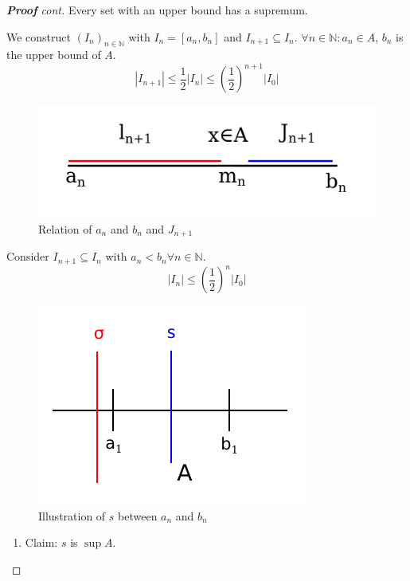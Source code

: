\documentclass[a4paper,landscape,twocolumn]{article}
\newcommand\abs[1]{\left|#1\right|}
\begin{document}
\begin{proof}[\textbf{Proof} cont]
  Every set with an upper bound has a supremum.

  We construct $(I_n)_{n \in \mathbb N}$ with $I_n = [a_n, b_n]$ and $I_{n+1} \subseteq I_n$.
  $\forall n \in \mathbb N: a_n \in A$, $b_n$ is the upper bound of $A$.
  \[ \abs{I_{n+1}} \leq \frac12 \abs{I_n} \leq \left(\frac12\right)^{n+1} \abs{I_0} \]

  \begin{figure}[!h]
    \begin{center}
      \includegraphics{img/proof_interval.pdf}
      \caption[width=200pt]{Relation of $a_n$ and $b_n$ and $J_{n+1}$}
    \end{center}
  \end{figure}

  Consider $I_{n+1} \subseteq I_n$ with $a_n < b_n \forall n \in \mathbb N$.
  \[ \abs{I_n} \leq \left(\frac12\right)^n \abs{I_0} \]

  \begin{figure}[!h]
    \begin{center}
      \includegraphics{img/proof_interval2.pdf}
      \caption[width=200pt]{Illustration of $s$ between $a_n$ and $b_n$}
    \end{center}
  \end{figure}

  \begin{enumerate}
    \item
      Claim: $s$ is $\sup{A}$.


\end{enumerate}
\end{proof}
\end{document}
